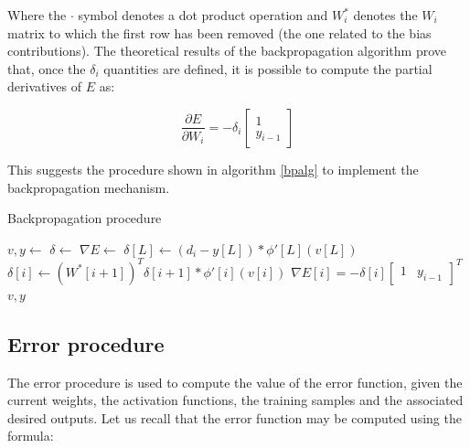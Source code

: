 \documentclass[letterpaper,headings=standardclasses]{scrartcl}
\begin{document}
Where the $\cdot$ symbol denotes a dot product operation and $W^*_i$ denotes the $W_i$ matrix to which the first row has been removed (the one related to the bias contributions). The theoretical results of the backpropagation algorithm prove that, once the $\delta_i$ quantities are defined, it is possible to compute the partial derivatives of $E$ as:

$$ \frac{\partial E}{\partial W_i} = - \delta_i \left[ \begin{matrix} 1 \\ y_{i - 1} \end{matrix} \right] $$

This suggests the procedure shown in algorithm \ref{bpalg} to implement the backpropagation mechanism.

\begin{algorithm}[h]
    \caption{Backpropagation procedure}
    \label{bpalg}
    \begin{algorithmic}
    
        \State {}
        \State $v, y \gets $ 
        \State $\delta \gets $ 
        \State $\nabla E \gets $ 
        \State {}
        \State $\delta[L] \gets (d_i - y[L]) * \phi'[L](v[L])$
            \State $\delta[i] \gets \left( W^*[i + 1] \right)^T \delta[i + 1] * \phi'[i](v[i])$
        \EndFor
        \State {}
            \State $\nabla E[i] = -\delta[i] \left[ \begin{matrix} 1 & y_{i - 1} \end{matrix} \right]^T$
        \EndFor
        \State \Return $v, y$
    \EndFunction
    
    \end{algorithmic}
\end{algorithm}

\subsection{Error procedure}

The error procedure is used to compute the value of the error function, given the current weights, the activation functions, the training samples and the associated desired outputs. Let us recall that the error function may be computed using the formula:
\end{document}
